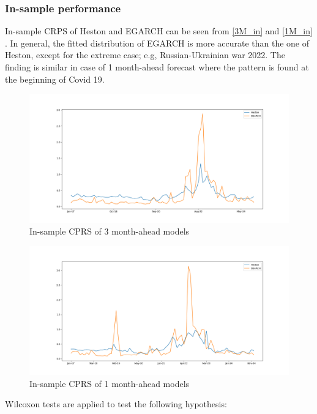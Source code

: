 \documentclass[12pt,a4paper]{article}
\newcommand\colorAutoref[1]{{\hypersetup{linkcolor=black}\autoref{#1}}}
\numberwithin{equation}{section}
\begin{document}
\subsubsection{In-sample performance}


In-sample CRPS of Heston and EGARCH can be seen from \colorAutoref{3M_in} and \colorAutoref{1M_in} . In general, the fitted distribution of EGARCH is more accurate than the one of Heston, except for the extreme case; e.g, Russian-Ukrainian war 2022. The finding is similar in case of 1 month-ahead forecast where the pattern is found at the beginning of Covid 19. 

\begin{figure}[h!] 
\includegraphics[scale=1,width=1\linewidth,height=0.4\textheight]{insample_crps_3m.png}
\caption{In-sample CPRS of 3 month-ahead models}
\label{3M_in}
\end{figure}

\begin{figure}[h!] 
\includegraphics[scale=1,width=1\linewidth,height=0.4\textheight]{insample_crps_1m.png}
\caption{In-sample CPRS of 1 month-ahead models}
\label{3M_in}
\end{figure}

Wilcoxon tests are applied to test the following hypothesis:
\end{document}
